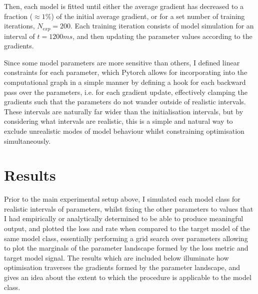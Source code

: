 \documentclass[mphil,deptreport,ianc]{infthesis} %
\begin{document}
Then, each model is fitted until either the average gradient has decreased to a fraction ($\approx 1 \%$) of the initial average gradient, or for a set number of training iterations, $N_{exp}=200$.
Each training iteration consists of model simulation for an interval of $t=1200 \si{ms}$, and then updating the parameter values according to the gradients.

Since some model parameters are more sensitive than others, I defined linear constraints for each parameter, which Pytorch allows for incorporating into the computational graph in a simple manner by defining a hook for each backward pass over the parameters, i.e. for each gradient update, effectively clamping the gradients such that the parameters do not wander outside of realistic intervals. These intervals are naturally far wider than the initialisation intervals, but by considering what intervals are realistic, this is a simple and natural way to exclude unrealistic modes of model behaviour whilst constraining optimisation simultaneously.



\section{Results}

Prior to the main experimental setup above, I simulated each model class for realistic intervals of parameters, whilst fixing the other parameters to values that I had empirically or analytically determined to be able to produce meaningful output, and plotted the loss and rate when compared to the target model of the same model class, essentially performing a grid search over parameters allowing to plot the marginals of the parameter landscape formed by the loss metric and target model signal.
The results which are included below illuminate how optimisation traverses the gradients formed by the parameter landscape, and gives an idea about the extent to which the procedure is applicable to the model class.
\end{document}
